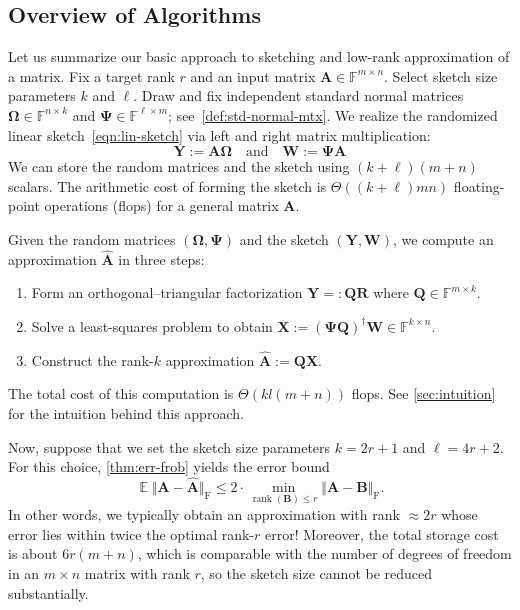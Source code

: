 \documentclass[final]{siamart1116}
\numberwithin{equation}{section}
\numberwithin{theorem}{section}
\numberwithin{figure}{section}
\newcommand{\F}{\mathbb{F}}
\newcommand{\mtx}[1]{\bm{#1}}
\newcommand{\rank}{\operatorname{rank}}
\newcommand{\norm}[1]{\Vert #1 \Vert}
\newcommand{\fnorm}[1]{\norm{#1}_{\mathrm{F}}}
\newcommand{\Expect}{\operatorname{\mathbb{E}}}
\begin{document}
\subsection{Overview of Algorithms}

Let us summarize our basic approach to sketching and low-rank approximation
of a matrix.
Fix a target rank $r$ and an input matrix $\mtx{A} \in \F^{m \times n}$.
Select sketch size parameters $k$ and $\ell$.
Draw and fix independent standard normal matrices $\mtx{\Omega} \in \F^{n \times k}$
and $\mtx{\Psi} \in \F^{\ell \times m}$; see~\cref{def:std-normal-mtx}.
We realize the randomized linear sketch~\cref{eqn:lin-sketch} via left and right
matrix multiplication:
\begin{equation} \label{eqn:sketch-intro}
\mtx{Y} := \mtx{A\Omega}
\quad\text{and}\quad
\mtx{W} := \mtx{\Psi A}
\end{equation}
We can store the random matrices and the sketch using $(k+\ell)(m+n)$ scalars.
The arithmetic cost of forming the sketch is $\Theta((k+\ell)mn)$ floating-point
operations (flops) for a general matrix $\mtx{A}$.

Given the random matrices $(\mtx{\Omega}, \mtx{\Psi})$ and the sketch $(\mtx{Y}, \mtx{W})$,
we compute an approximation $\hat{\mtx{A}}$ in three steps:
\vspace{0.5pc}
\begin{enumerate}
\item	Form an orthogonal--triangular factorization $\mtx{Y} =: \mtx{QR}$ where $\mtx{Q} \in \F^{m \times k}$.
\item	Solve a least-squares problem to obtain $\mtx{X} := (\mtx{\Psi} \mtx{Q})^\dagger \mtx{W} \in \F^{k \times n}$.
\item	Construct the rank-$k$ approximation $\hat{\mtx{A}} := \mtx{QX}$.
\end{enumerate}
\vspace{0.5pc}
The total cost of this computation is $\Theta(kl (m + n))$ flops.
See \cref{sec:intuition} for the intuition behind this approach.

Now, suppose that we set the sketch size parameters $k = 2r+1$ and $\ell = 4r+2$.
For this choice, \cref{thm:err-frob} yields the error bound
$$
\Expect \fnorm{\mtx{A} - \hat{\mtx{A}}} \leq 2 \cdot \min_{\rank(\mtx{B}) \leq r} \fnorm{ \mtx{A} - \mtx{B} }.
$$
In other words, we typically obtain an approximation with rank $\approx 2r$ whose error lies
within twice the optimal rank-$r$ error!   Moreover, the total storage cost is about $6r(m+n)$,
which is comparable with the number of degrees of freedom in an $m \times n$ matrix with rank $r$,
so the sketch size cannot be reduced substantially.
\end{document}
